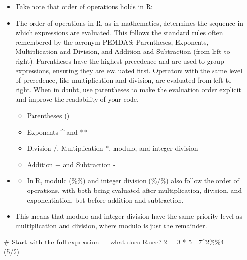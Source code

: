 \documentclass[
  letterpaper,
  DIV=11,
  numbers=noendperiod]{scrreprt}
\newenvironment{Shaded}{\begin{snugshade}}{\end{snugshade}}
\newcommand{\CommentTok}[1]{\textcolor[rgb]{0.37,0.37,0.37}{#1}}
\newcommand{\DecValTok}[1]{\textcolor[rgb]{0.68,0.00,0.00}{#1}}
\newcommand{\NormalTok}[1]{\textcolor[rgb]{0.00,0.23,0.31}{#1}}
\newcommand{\SpecialCharTok}[1]{\textcolor[rgb]{0.37,0.37,0.37}{#1}}
\providecommand{\tightlist}{%
  \setlength{\itemsep}{0pt}\setlength{\parskip}{0pt}}\usepackage{longtable,booktabs,array}
\begin{document}
\begin{itemize}
\item
  Take note that order of operations holds in R:
\item
  The order of operations in R, as in mathematics, determines the
  sequence in which expressions are evaluated. This follows the standard
  rules often remembered by the acronym PEMDAS: Parentheses, Exponents,
  Multiplication and Division, and Addition and Subtraction (from left
  to right). Parentheses have the highest precedence and are used to
  group expressions, ensuring they are evaluated first. Operators with
  the same level of precedence, like multiplication and division, are
  evaluated from left to right. When in doubt, use parentheses to make
  the evaluation order explicit and improve the readability of your
  code.

  \begin{itemize}
  \tightlist
  \item
    Parentheses ()
  \item
    Exponents \^{} and \(**\)
  \item
    Division \(/\), Multiplication \(*\), modulo, and integer division
  \item
    Addition + and Subtraction -
  \end{itemize}
\item
  \begin{itemize}
  \tightlist
  \item
    In R, modulo (\%\%) and integer division (\%/\%) also follow the
    order of operations, with both being evaluated after multiplication,
    division, and exponentiation, but before addition and subtraction.
  \end{itemize}
\item
  This means that modulo and integer division have the same priority
  level as multiplication and division, where modulo is just the
  remainder.
\end{itemize}

\begin{Shaded}
\begin{Highlighting}[]
\CommentTok{\# Start with the full expression — what does R see?}
\DecValTok{2} \SpecialCharTok{+} \DecValTok{3} \SpecialCharTok{*} \DecValTok{5} \SpecialCharTok{{-}} \DecValTok{7}\SpecialCharTok{\^{}}\DecValTok{2}\SpecialCharTok{\%\%}\DecValTok{4} \SpecialCharTok{+}\NormalTok{ (}\DecValTok{5}\SpecialCharTok{/}\DecValTok{2}\NormalTok{)}
\end{Highlighting}
\end{Shaded}
\end{document}
